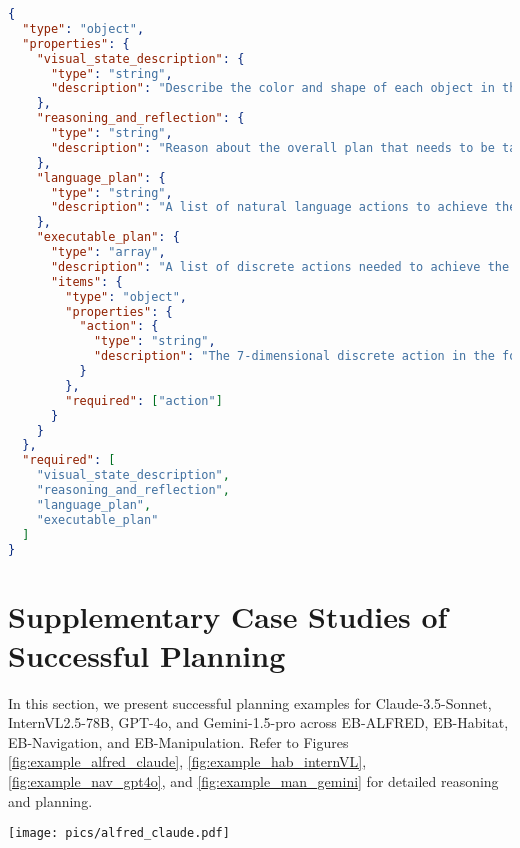 \begin{tcolorbox}[colback=gray!5!white, colframe=gray!75!black, 
title=Output JSON Schema for EB-Manipulation, boxrule=0.5mm, width=\textwidth, arc=3mm, auto outer arc=true]
\begin{lstlisting}[language=json]
{
  "type": "object",
  "properties": {
    "visual_state_description": {
      "type": "string",
      "description": "Describe the color and shape of each object in the detection box in numerical order in the image. Then provide the 3D coordinates of the objects chosen from input."
    },
    "reasoning_and_reflection": {
      "type": "string",
      "description": "Reason about the overall plan that needs to be taken on the target objects, and reflect on the previous actions taken if available."
    },
    "language_plan": {
      "type": "string",
      "description": "A list of natural language actions to achieve the user instruction. Each language action is started by the step number and the language action name."
    },
    "executable_plan": {
      "type": "array",
      "description": "A list of discrete actions needed to achieve the user instruction, with each discrete action being a 7-dimensional discrete action.",
      "items": {
        "type": "object",
        "properties": {
          "action": {
            "type": "string",
            "description": "The 7-dimensional discrete action in the format of a list given by the prompt."
          }
        },
        "required": ["action"]
      }
    }
  },
  "required": [
    "visual_state_description", 
    "reasoning_and_reflection", 
    "language_plan", 
    "executable_plan"
  ]
}
\end{lstlisting}
\end{tcolorbox}



\clearpage
\section{Supplementary Case Studies of Successful Planning}
\label{ap:success_planningapapp}
In this section, we present successful planning examples for Claude-3.5-Sonnet, InternVL2.5-78B, GPT-4o, and Gemini-1.5-pro across EB-ALFRED, EB-Habitat, EB-Navigation, and EB-Manipulation. Refer to Figures \ref{fig:example_alfred_claude}, \ref{fig:example_hab_internVL}, \ref{fig:example_nav_gpt4o}, and \ref{fig:example_man_gemini} for detailed reasoning and planning.


\begin{figure*}[h!]
\begin{center}
\texttt{[image: pics/alfred\_claude.pdf]}
\end{center}
\vspace{-1em}
\caption{Planning example of Claude-3.5-Sonnet in EB-AFRED.}
\label{fig:example_alfred_claude}
\end{figure*}

